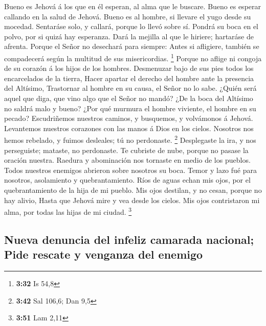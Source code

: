  Bueno es Jehová á los que en él esperan, al alma que le
buscare.  Bueno es esperar callando en la salud de
Jehová.  Bueno es al hombre, si llevare el yugo desde su
mocedad.  Sentaráse solo, y callará, porque lo llevó
sobre sí.  Pondrá su boca en el polvo, por si quizá hay
esperanza.  Dará la mejilla al que le hiriere; hartaráse
de afrenta.  Porque el Señor no desechará para siempre:
 Antes si afligiere, también se compadecerá según la
multitud de sus misericordias. \footnote{\textbf{3:32} Is 54,8}
 Porque no aflige ni congoja de su corazón á los hijos de
los hombres.  Desmenuzar bajo de sus pies todos los
encarcelados de la tierra,  Hacer apartar el derecho del
hombre ante la presencia del Altísimo,  Trastornar al
hombre en su causa, el Señor no lo sabe.  ¿Quién será
aquel que diga, que vino algo que el Señor no mandó?  ¿De
la boca del Altísimo no saldrá malo y bueno?  ¿Por qué
murmura el hombre viviente, el hombre en su pecado? 
Escudriñemos nuestros caminos, y busquemos, y volvámonos á Jehová.
 Levantemos nuestros corazones con las manos á Dios en
los cielos.  Nosotros nos hemos rebelado, y fuimos
desleales; tú no perdonaste. \footnote{\textbf{3:42} Sal 106,6; Dan 9,5}
 Desplegaste la ira, y nos perseguiste; mataste, no
perdonaste.  Te cubriste de nube, porque no pasase la
oración nuestra.  Raedura y abominación nos tornaste en
medio de los pueblos.  Todos nuestros enemigos abrieron
sobre nosotros su boca.  Temor y lazo fué para nosotros,
asolamiento y quebrantamiento.  Ríos de aguas echan mis
ojos, por el quebrantamiento de la hija de mi pueblo. 
Mis ojos destilan, y no cesan, porque no hay alivio, 
Hasta que Jehová mire y vea desde los cielos.  Mis ojos
contristaron mi alma, por todas las hijas de mi ciudad. \footnote{\textbf{3:51}
  Lam 2,11}

\hypertarget{nueva-denuncia-del-infeliz-camarada-nacional-pide-rescate-y-venganza-del-enemigo}{%
\subsection{Nueva denuncia del infeliz camarada nacional; Pide rescate y
venganza del
enemigo}\label{nueva-denuncia-del-infeliz-camarada-nacional-pide-rescate-y-venganza-del-enemigo}}

